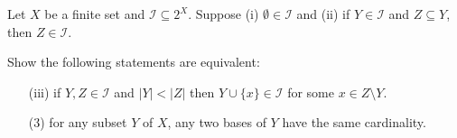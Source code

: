 \documentclass[10pt]{article}
\begin{document}
\begin{problem}[Exercise 10.1]
    Let \( X \) be a finite set and \( \mathcal{I}\subseteq 2^X \). Suppose (i) \( \emptyset \in \mathcal{I} \) and (ii) if \( Y\in \mathcal{I} \) and \( Z\subseteq Y \), then \( Z\in\mathcal{I} \).

    Show the following statements are equivalent:
    \begin{itemize}[nolistsep]
        \item[(iii)] if \( Y,Z\in\mathcal{I} \) and \( |Y|<|Z| \) then \( Y\cup\{x\}\in\mathcal{I} \) for some \( x\in Z\setminus Y \).
        \item[(3)] for any subset \( Y \) of \( X \), any two bases of \( Y \) have the same cardinality.
    \end{itemize}
\end{problem}
\end{document}
